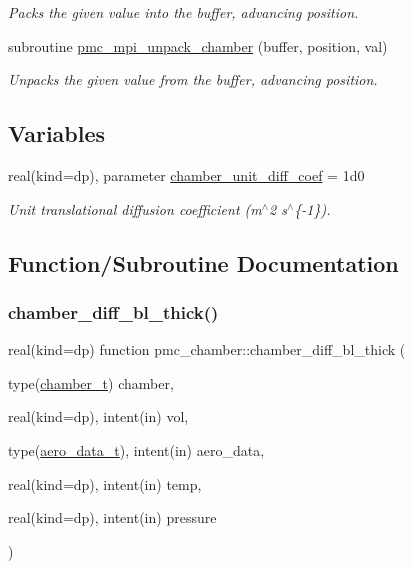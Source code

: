 \begin{DoxyCompactItemize}
\begin{DoxyCompactList}\small\item\em Packs the given value into the buffer, advancing position. \end{DoxyCompactList}\item 
subroutine \mbox{\hyperlink{namespacepmc__chamber_a20b7398d417e3934836033c151046fe7}{pmc\+\_\+mpi\+\_\+unpack\+\_\+chamber}} (buffer, position, val)
\begin{DoxyCompactList}\small\item\em Unpacks the given value from the buffer, advancing position. \end{DoxyCompactList}\end{DoxyCompactItemize}
\subsection*{Variables}
\begin{DoxyCompactItemize}
\item 
real(kind=dp), parameter \mbox{\hyperlink{namespacepmc__chamber_a1ce68b9e5f462ab5f363ba40ee8a2a2b}{chamber\+\_\+unit\+\_\+diff\+\_\+coef}} = 1d0
\begin{DoxyCompactList}\small\item\em Unit translational diffusion coefficient (m$^\wedge$2 s$^\wedge$\{-\/1\}). \end{DoxyCompactList}\end{DoxyCompactItemize}


\subsection{Function/\+Subroutine Documentation}
\mbox{\label{namespacepmc__chamber_a915f3d6e535e4f3a792faf470e74aa59}} 
\subsubsection{\texorpdfstring{chamber\+\_\+diff\+\_\+bl\+\_\+thick()}{chamber\_diff\_bl\_thick()}}
{\footnotesize\ttfamily real(kind=dp) function pmc\+\_\+chamber\+::chamber\+\_\+diff\+\_\+bl\+\_\+thick (\begin{DoxyParamCaption}\item[{type(\mbox{\hyperlink{structpmc__chamber_1_1chamber__t}{chamber\+\_\+t}})}]{chamber,  }\item[{real(kind=dp), intent(in)}]{vol,  }\item[{type(\mbox{\hyperlink{structpmc__aero__data_1_1aero__data__t}{aero\+\_\+data\+\_\+t}}), intent(in)}]{aero\+\_\+data,  }\item[{real(kind=dp), intent(in)}]{temp,  }\item[{real(kind=dp), intent(in)}]{pressure }\end{DoxyParamCaption})}



